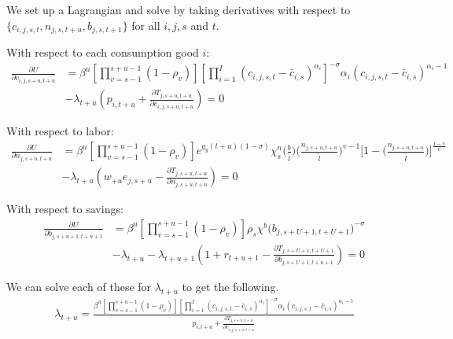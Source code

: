     We set up a Lagrangian and solve by taking derivatives with respect to $\{c_{i,j,s,t},n_{j,s,t+u},b_{j,s,t+1}\}$ for all $i,j,s$ and $t$.

    With respect to each consumption good $i$:
    \begin{equation}\label{Eqcfoc}
      \begin{split}
      \frac{\partial U}{\partial c_{i,j,s+u,t+u}} & = \beta^u\left[\prod_{v=s-1}^{s+u-1}(1-\rho_v)\right] \left[ \prod_{i=1}^I \left( c_{i,j,s,t} - \bar c_{i,s} \right) ^{\alpha_i} \right]^{-\sigma}\alpha_i \left( c_{i,j,s,t} - \bar c_{i,s} \right)^{\alpha_i-1} \\
       & - \lambda_{t+u} \left( p_{i,t+u} + \frac{\partial T_{j,s+u,t+u}}{\partial c_{i,j,s+u,t+u}} \right)= 0
        \end{split}
    \end{equation}

    With respect to labor:
    \begin{equation}\label{Eqnfoc}
      \begin{split}
      \frac{\partial U}{\partial n_{j,s+u,t+u}} & = \beta^u\left[\prod_{v=s-1}^{s+u-1}(1-\rho_v)\right] e^{g_y (t+u)(1-\sigma)}\chi^n_{s}\biggl(\frac{b}{\tilde{l}}\biggr)\biggl(\frac{n_{j,s+u,t+u}}{\tilde{l}}\biggr)^{v-1}\Biggl[1 - \biggl(\frac{n_{j,s+u,t+u}}{\tilde{l}}\biggr)\Biggr]^{\frac{1-v}{v}} \\
      & - \lambda_{t+u} \left( w_{+u} e_{j,s+u} - \frac{\partial T_{j,s+u,t+u}}{\partial n_{j,s+u,t+u}} \right)= 0
        \end{split}
    \end{equation}

    With respect to savings:
    \begin{equation}\label{Eqbfoc}
      \begin{split}
      \frac{\partial U}{\partial b_{j,s+u+1,t+u+1}} & = \beta^u\left[\prod_{v=s-1}^{s+u-1}(1-\rho_v)\right] \rho_s\chi^b\bigl(b_{j,s+U+1,t+U+1}\bigr)^{-\sigma} \\
      & - \lambda_{t+u} - \lambda_{t+u+1} \left( 1 + r_{t+u+1} - \frac{\partial T_{j,s+U+1,t+U+1}}{\partial b_{j,s+U+1,t+u+1}} \right)= 0
      \end{split}
    \end{equation}

    We can solve each of these for $\lambda_{t+u}$ to get the following.
    \begin{equation}
      \begin{split}
      \lambda_{t+u} = \frac{ \beta^u\left[\prod_{v=s-1}^{s+u-1}(1-\rho_v)\right] \left[ \prod_{i=1}^I \left( c_{i,j,s,t} - \bar c_{i,s} \right) ^{\alpha_i} \right]^{-\sigma}\alpha_i \left( c_{i,j,s,t} - \bar c_{i,s} \right)^{\alpha_i-1} } { p_{i,t+u} + \frac{\partial T_{j,s+u,t+u}}{\partial c_{i,j,s+u,t+u}} } \nonumber
      \end{split}
    \end{equation}

